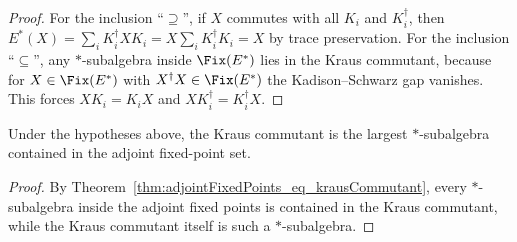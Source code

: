 \begin{proof}\leanok
    For the inclusion ``$\supseteq$'', if $X$ commutes with all $K_i$ and
    $K_i^\dagger$, then
    $E^*(X)=\sum_iK_i^\dagger XK_i
        =X\sum_iK_i^\dagger K_i=X$ by trace preservation.
    For the inclusion ``$\subseteq$'', any $*$-subalgebra inside
    $\Fix(E^*)$ lies in the Kraus commutant, because for
    $X\in\Fix(E^*)$ with $X^\dagger X\in\Fix(E^*)$ the
    Kadison--Schwarz gap vanishes. This forces
    $XK_i=K_iX$ and $XK_i^\dagger=K_i^\dagger X$.
\end{proof}

\begin{theorem}
    \label{thm:kraus_commutant_greatest}
    \leanok
    Under the hypotheses above, the Kraus commutant is the largest
    $*$-subalgebra contained in the adjoint fixed-point set.
\end{theorem}

\begin{proof}\leanok
    By Theorem~\ref{thm:adjointFixedPoints_eq_krausCommutant}, every
    $*$-subalgebra inside the adjoint fixed points is contained in the Kraus
    commutant, while the Kraus commutant itself is such a $*$-subalgebra.
\end{proof}
